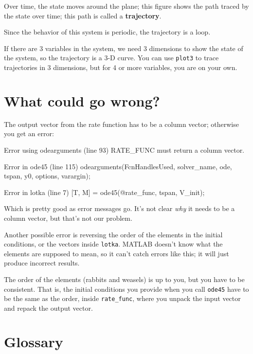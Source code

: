 \documentclass[
]{book}
\numberwithin{Answer}{chapter}
\numberwithin{Exercise}{chapter}
\begin{document}
Over time, the state moves around the plane; this figure shows
the path traced by the state over time; this path
is called a {\bf trajectory}.

Since the behavior of this system is periodic, the trajectory is a loop.

If there are 3 variables in the system, we need 3 dimensions to show
the state of the system, so the trajectory is a 3-D curve.
You can use {\tt plot3} to trace trajectories in 3 dimensions,
but for 4 or more variables, you are on your own.



\section{What could go wrong?}

The output vector from the rate function has to be a column vector; otherwise you get an error:

\begin{code}
Error using odearguments (line 93)
RATE_FUNC must return a column vector.

Error in ode45 (line 115)
  odearguments(FcnHandlesUsed, solver_name, ode, tspan, y0, 
               options, varargin);

Error in lotka (line 7)
    [T, M] = ode45(@rate_func, tspan, V_init);
\end{code}

Which is pretty good as error messages go.  It's not clear {\em why}
it needs to be a column vector, but that's not our problem.


Another possible error is reversing the order of the elements in the
initial conditions, or the vectors inside {\tt lotka}.  MATLAB
doesn't know what the elements are supposed to mean, so it can't catch
errors like this; it will just produce incorrect results.

The order of the elements (rabbits and weasels) is up to you, but
you have to be consistent.  That is, the initial conditions you
provide when you call {\tt ode45} have to be the same as the order,
inside \verb"rate_func", where you unpack the input vector and repack
the output vector.



\section{Glossary}
\end{document}
